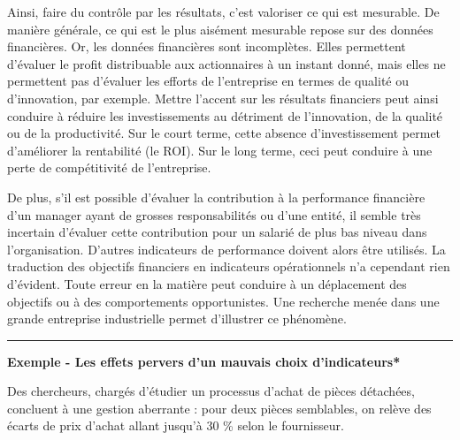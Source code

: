 \documentclass[oneside]{kaobook}
\begin{document}
Ainsi, faire du contrôle par les résultats, c’est valoriser ce qui est mesurable. De manière générale, ce qui est le plus aisément mesurable repose sur des données financières. Or, les données financières sont incomplètes. Elles permettent d’évaluer le profit distribuable aux actionnaires à un instant donné, mais elles ne permettent pas d’évaluer les efforts de l’entreprise en termes de qualité ou d’innovation, par exemple. Mettre l’accent sur les résultats financiers peut ainsi conduire à réduire les investissements au détriment de l’innovation, de la qualité ou de la productivité. Sur le court terme, cette absence d’investissement permet d’améliorer la rentabilité (le ROI). Sur le long terme, ceci peut conduire à une perte de compétitivité de l’entreprise. 

De plus, s’il est possible d’évaluer la contribution à la performance financière d’un manager ayant de grosses responsabilités ou d’une entité, il semble très incertain d’évaluer cette contribution pour un salarié de plus bas niveau dans l’organisation. D’autres indicateurs de performance doivent alors être utilisés. La traduction des objectifs financiers en indicateurs opérationnels n’a cependant rien d’évident. Toute erreur en la matière peut conduire à un déplacement des objectifs ou à des comportements opportunistes. Une recherche menée dans une grande entreprise industrielle permet d’illustrer ce phénomène.

\noindent\rule{\textwidth}{0.5pt}
\textbf{Exemple - Les effets pervers d'un mauvais choix d'indicateurs*}

Des chercheurs, chargés d’étudier un processus d’achat de pièces détachées, concluent à une gestion aberrante : pour deux pièces semblables, on relève des écarts de prix d’achat allant jusqu’à 30 \% selon le fournisseur.
\end{document}
